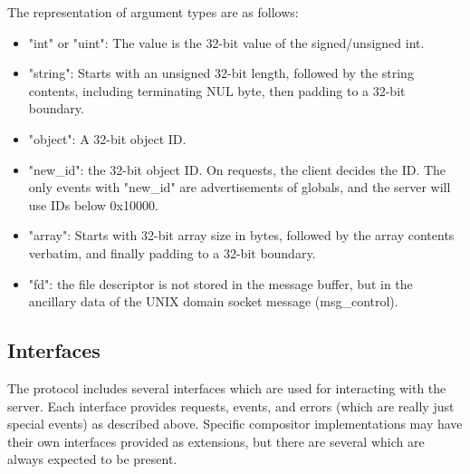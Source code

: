 \documentclass{article}
\begin{document}
The representation of argument types are as follows:
\begin{itemize}
\item "int" or "uint": The value is the 32-bit value of the signed/unsigned
  int.
\item "string": Starts with an unsigned 32-bit length, followed by the
  string contents, including terminating NUL byte, then padding to a
  32-bit boundary.
\item "object": A 32-bit object ID.
\item "new\_id": the 32-bit object ID.  On requests, the client
  decides the ID.  The only events with "new\_id" are advertisements of
  globals, and the server will use IDs below 0x10000.
\item "array": Starts with 32-bit array size in bytes, followed by the array
  contents verbatim, and finally padding to a 32-bit boundary.
\item "fd": the file descriptor is not stored in the message buffer, but in
  the ancillary data of the UNIX domain socket message (msg\_control).
\end{itemize}

\subsection{Interfaces}

The protocol includes several interfaces which are used for
interacting with the server.  Each interface provides requests,
events, and errors (which are really just special events) as described
above.  Specific compositor implementations may have their own
interfaces provided as extensions, but there are several which are
always expected to be present.
\end{document}
